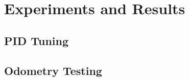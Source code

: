 \chapter{Experiments and Results}
\label{chapter6}
\ifpdf
\graphicspath{{Chapter6/Figs/Raster/}{Chapter6/Figs/PDF/}{Chapter6/Figs/}}
\else
\graphicspath{{Chapter6/Figs/Vector/}{Chapter6/Figs/}}
\fi
\section{PID Tuning}
\section{Odometry Testing}